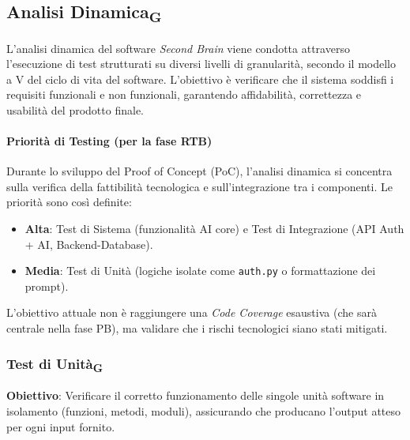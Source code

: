 \documentclass[11pt,a4paper]{article}
\begin{document}
\newpage
\subsection{Analisi Dinamica\textsubscript{G}}
L'analisi dinamica del software \textit{Second Brain} viene condotta attraverso l'esecuzione di test strutturati su diversi livelli di granularità, secondo il modello a V del ciclo di vita del software. L'obiettivo è verificare che il sistema soddisfi i requisiti funzionali e non funzionali, garantendo affidabilità, correttezza e usabilità del prodotto finale.

\paragraph{Priorità di Testing (per la fase RTB)}
Durante lo sviluppo del Proof of Concept (PoC), l'analisi dinamica si concentra sulla verifica della fattibilità tecnologica e sull'integrazione tra i componenti. Le priorità sono così definite:
\begin{itemize}
    \item \textbf{Alta}: Test di Sistema (funzionalità AI core) e Test di Integrazione (API Auth + AI, Backend-Database).
    \item \textbf{Media}: Test di Unità (logiche isolate come \texttt{auth.py} o formattazione dei prompt).
\end{itemize}
L'obiettivo attuale non è raggiungere una \textit{Code Coverage} esaustiva (che sarà centrale nella fase PB), ma validare che i rischi tecnologici siano stati mitigati.

\subsubsection{Test di Unità\textsubscript{G}}
\textbf{Obiettivo}: Verificare il corretto funzionamento delle singole unità software in isolamento (funzioni, metodi, moduli), assicurando che producano l'output atteso per ogni input fornito.
\end{document}
